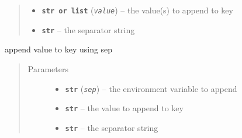 \documentclass[a4paper,10pt,english]{sphinxmanual}
\begin{document}
\begin{fulllineitems}
\begin{fulllineitems}
\begin{quote}
\begin{description}
\begin{itemize}
\item {} 
\textbf{\texttt{str or list}} (\emph{\texttt{value}}) -- the value(s) to append to key

\item {} 
\textbf{\texttt{str}} -- the separator string

\end{itemize}

\end{description}\end{quote}

\end{fulllineitems}


\begin{fulllineitems}
\label{commands/apidoc/src:src.fileEnviron.LauncherFileEnviron.append_value}
append value to key using sep
\begin{quote}\begin{description}
\item[{Parameters}] \leavevmode\begin{itemize}
\item {} 
\textbf{\texttt{str}} (\emph{\texttt{sep}}) -- the environment variable to append

\item {} 
\textbf{\texttt{str}} -- the value to append to key

\item {} 
\textbf{\texttt{str}} -- the separator string

\end{itemize}

\end{description}\end{quote}

\end{fulllineitems}


\begin{fulllineitems}
\label{commands/apidoc/src:src.fileEnviron.LauncherFileEnviron.change_to_launcher}
\end{fulllineitems}



\end{fulllineitems}
\end{document}
